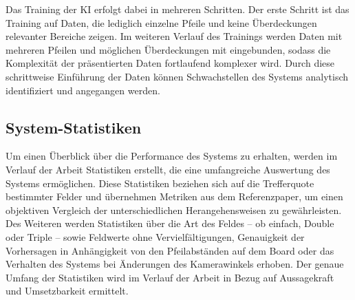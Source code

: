 Das Training der KI erfolgt dabei in mehreren Schritten. Der erste Schritt ist das Training auf Daten, die lediglich einzelne Pfeile und keine Überdeckungen relevanter Bereiche zeigen. Im weiteren Verlauf des Trainings werden Daten mit mehreren Pfeilen und möglichen Überdeckungen mit eingebunden, sodass die Komplexität der präsentierten Daten fortlaufend komplexer wird. Durch diese schrittweise Einführung der Daten können Schwachstellen des Systems analytisch identifiziert und angegangen werden.

\subsection{System-Statistiken}
\label{sec:methodik:statistiken}

Um einen Überblick über die Performance des Systems zu erhalten, werden im Verlauf der Arbeit Statistiken erstellt, die eine umfangreiche Auswertung des Systems ermöglichen. Diese Statistiken beziehen sich auf die Trefferquote bestimmter Felder und übernehmen Metriken aus dem Referenzpaper, um einen objektiven Vergleich der unterschiedlichen Herangehensweisen zu gewährleisten. Des Weiteren werden Statistiken über die Art des Feldes -- ob einfach, Double oder Triple -- sowie Feldwerte ohne Vervielfältigungen, Genauigkeit der Vorhersagen in Anhängigkeit von den Pfeilabständen auf dem Board oder das Verhalten des Systems bei Änderungen des Kamerawinkels erhoben. Der genaue Umfang der Statistiken wird im Verlauf der Arbeit in Bezug auf Aussagekraft und Umsetzbarkeit ermittelt.

